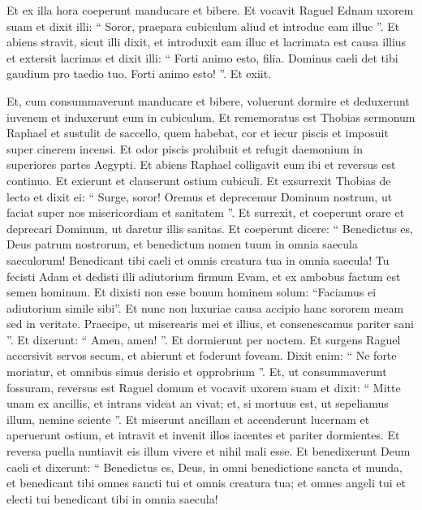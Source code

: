\begin{biblechapter}
\begin{biblechapter}
\begin{biblechapter}
\begin{biblechapter}
\begin{biblechapter}
\begin{biblechapter}
\begin{biblechapter}
\verse Et ex illa hora coeperunt manducare et bibere. 
 \verse Et vocavit Raguel Ednam uxorem suam et dixit illi: “ Soror, praepara cubiculum aliud et introduc eam illuc ”. 
\verse Et abiens stravit, sicut illi dixit, et introduxit eam illuc et lacrimata est causa illius et extersit lacrimas et dixit illi: 
\verse “ Forti animo esto, filia. Dominus caeli det tibi gaudium pro taedio tuo. Forti animo esto! ”. Et exiit.
 
\begin{biblechapter}
\verse Et, cum consummaverunt manducare et bibere, voluerunt dormire et deduxerunt iuvenem et induxerunt eum in cubiculum. 
\verse Et rememoratus est Thobias sermonum Raphael et sustulit de saccello, quem habebat, cor et iecur piscis et imposuit super cinerem incensi. 
\verse Et odor piscis prohibuit et refugit daemonium in superiores partes Aegypti. Et abiens Raphael colligavit eum ibi et reversus est continuo. 
\verse Et exierunt et clauserunt ostium cubiculi. Et exsurrexit Thobias de lecto et dixit ei: “ Surge, soror! Oremus et deprecemur Dominum nostrum, ut faciat super nos misericordiam et sanitatem ”. 
\verse Et surrexit, et coeperunt orare et deprecari Dominum, ut daretur illis sanitas. Et coeperunt dicere: “ Benedictus es, Deus patrum nostrorum, et benedictum nomen tuum in omnia saecula saeculorum! Benedicant tibi caeli et omnis creatura tua in omnia saecula! 
\verse Tu fecisti Adam et dedisti illi adiutorium firmum Evam, et ex ambobus factum est semen hominum. Et dixisti non esse bonum hominem solum: “Faciamus ei adiutorium simile sibi”. 
\verse Et nunc non luxuriae causa accipio hanc sororem meam sed in veritate. Praecipe, ut miserearis mei et illius, et consenescamus pariter sani ”. 
\verse Et dixerunt: “ Amen, amen! ”. 
\verse Et dormierunt per noctem.
 Et surgens Raguel accersivit servos secum, et abierunt et foderunt foveam. 
 \verse Dixit enim: “ Ne forte moriatur, et omnibus simus derisio et opprobrium ”. 
\verse Et, ut consummaverunt fossuram, reversus est Raguel domum et vocavit uxorem suam 
\verse et dixit: “ Mitte unam ex ancillis, et intrans videat an vivat; et, si mortuus est, ut sepeliamus illum, nemine sciente ”. 
\verse Et miserunt ancillam et accenderunt lucernam et aperuerunt ostium, et intravit et invenit illos iacentes et pariter dormientes. 
\verse Et reversa puella nuntiavit eis illum vivere et nihil mali esse. 
\verse Et benedixerunt Deum caeli et dixerunt: “ Benedictus es, Deus, in omni benedictione sancta et munda, et benedicant tibi omnes sancti tui et omnis creatura tua; et omnes angeli tui et electi tui benedicant tibi in omnia saecula! 

\end{biblechapter}
\end{biblechapter}
\end{biblechapter}
\end{biblechapter}
\end{biblechapter}
\end{biblechapter}
\end{biblechapter}
\end{biblechapter}
